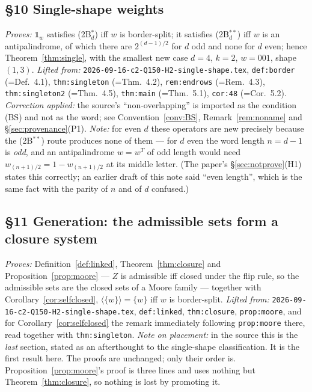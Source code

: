 \documentclass[11pt]{article}
\theoremstyle{definition}
\theoremstyle{remark}
\newcommand{\one}{\mathbb{1}}
\begin{document}
\subsection*{\S10 Single-shape weights}\label{sec:single}
\emph{Proves:} $\one_w$ satisfies (2B$^{*}_d$) iff $w$ is border-split; it satisfies
(2B$^{**}_d$) iff $w$ is an antipalindrome, of which there are $2^{(d-1)/2}$ for $d$ odd and
none for $d$ even; hence Theorem~\ref{thm:single}, with the smallest new case $d=4$, $k=2$,
$w=001$, shape $(1,3)$.
\emph{Lifted from:} \texttt{2026-09-16-c2-Q150-H2-single-shape.tex}, \texttt{def:border}
(=Def.~4.1), \texttt{thm:singleton} (=Thm.~4.2), \texttt{rem:endrows} (=Rem.~4.3),
\texttt{thm:singleton2} (=Thm.~4.5), \texttt{thm:main} (=Thm.~5.1), \texttt{cor:48}
(=Cor.~5.2).
\emph{Correction applied:} the source's ``non-overlapping'' is imported as the condition
(BS) and not as the word; see Convention~\ref{conv:BS}, Remark~\ref{rem:noname} and
\S\ref{sec:provenance}(P1).
\emph{Note:} for even $d$ these operators are new precisely because the (2B$^{**}$) route
produces none of them --- for $d$ even the word length $n=d-1$ is \emph{odd}, and an
antipalindrome $w=w^{T}$ of odd length would need $w_{(n+1)/2}=1-w_{(n+1)/2}$ at its middle
letter.  (The paper's \S\ref{sec:notprove}(H1) states this correctly; an earlier draft of this
note said ``even length'', which is the same fact with the parity of $n$ and of $d$ confused.)

\subsection*{\S11 Generation: the admissible sets form a closure system}
\emph{Proves:} Definition~\ref{def:linked}, Theorem~\ref{thm:closure} and
Proposition~\ref{prop:moore} --- $Z$ is admissible iff closed under the flip rule, so the
admissible sets are the closed sets of a Moore family --- together with
Corollary~\ref{cor:selfclosed}, $\langle\{w\}\rangle=\{w\}$ iff $w$ is border-split.
\emph{Lifted from:} \texttt{2026-09-16-c2-Q150-H2-single-shape.tex}, \texttt{def:linked},
\texttt{thm:closure}, \texttt{prop:moore}, and for Corollary~\ref{cor:selfclosed} the remark
immediately following \texttt{prop:moore} there, read together with \texttt{thm:singleton}.
\emph{Note on placement:} in the source this is the \emph{last} section, stated as an
afterthought to the single-shape classification.  It is the first result here.  The proofs are
unchanged; only their order is.  Proposition~\ref{prop:moore}'s proof is three lines and uses
nothing but Theorem~\ref{thm:closure}, so nothing is lost by promoting it.
\end{document}
